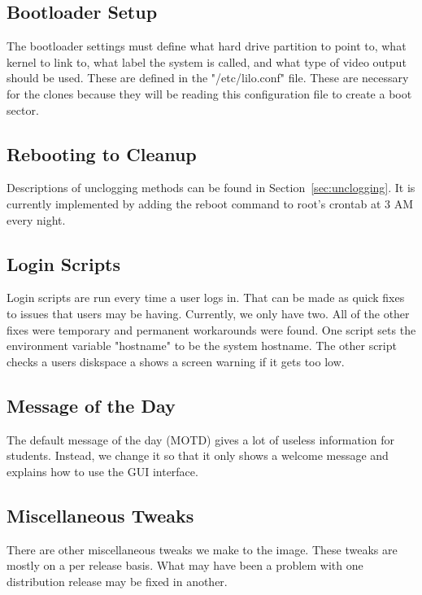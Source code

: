 \subsection{Bootloader Setup}
The bootloader settings must define what hard drive partition to point to, what kernel to link to, what label the system is called, and what type of video output should be used.  These are defined in the "/etc/lilo.conf" file.  These are necessary for the clones because they will be reading this configuration file to create a boot sector.

\subsection{Rebooting to Cleanup}
Descriptions of unclogging methods can be found in Section~\ref{sec:unclogging}.  It is currently implemented by adding the reboot command to root's crontab at 3 AM every night.  

\subsection{Login Scripts}
Login scripts are run every time a user logs in.  That can be made as quick fixes to issues that users may be having.  Currently, we only have two.  All of the other fixes were temporary and permanent workarounds were found.  One script sets the environment variable "hostname" to be the system hostname.  The other script checks a users diskspace a shows a screen warning if it gets too low.  

\subsection{Message of the Day}
The default message of the day (MOTD) gives a lot of useless information for students.  Instead, we change it so that it only shows a welcome message and explains how to use the GUI interface.  

\subsection{Miscellaneous Tweaks}
There are other miscellaneous tweaks we make to the image.  These tweaks are mostly on a per release basis.  What may have been a problem with one distribution release may be fixed in another.  
